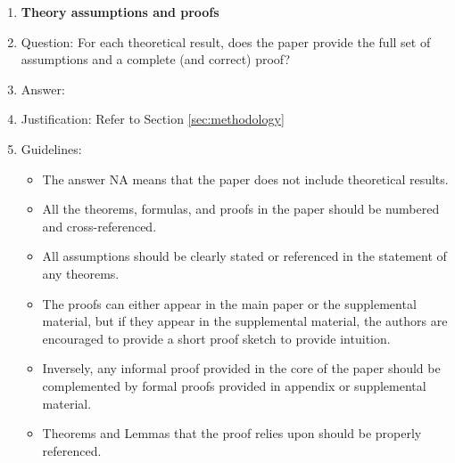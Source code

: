 \documentclass{article}
\begin{document}
\begin{enumerate}
\item {\bf Theory assumptions and proofs}
    \item[] Question: For each theoretical result, does the paper provide the full set of assumptions and a complete (and correct) proof?
    \item[] Answer: \answerYes{} %
    \item[] Justification: Refer to Section \ref{sec:methodology}
    \item[] Guidelines:
    \begin{itemize}
        \item The answer NA means that the paper does not include theoretical results. 
        \item All the theorems, formulas, and proofs in the paper should be numbered and cross-referenced.
        \item All assumptions should be clearly stated or referenced in the statement of any theorems.
        \item The proofs can either appear in the main paper or the supplemental material, but if they appear in the supplemental material, the authors are encouraged to provide a short proof sketch to provide intuition. 
        \item Inversely, any informal proof provided in the core of the paper should be complemented by formal proofs provided in appendix or supplemental material.
        \item Theorems and Lemmas that the proof relies upon should be properly referenced. 
    \end{itemize}


\end{enumerate}
\end{document}
